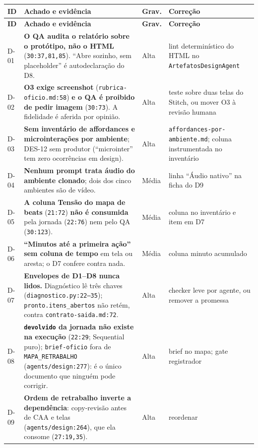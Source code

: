 \documentclass[11pt,a4paper]{article}
\begin{document}
\small
\begin{longtable}{@{}p{0.9cm} >{\raggedright\arraybackslash}p{8.6cm} p{1.1cm} >{\raggedright\arraybackslash}p{4.9cm}@{}}
\toprule
\textbf{ID} & \textbf{Achado e evidência} & \textbf{Grav.} & \textbf{Correção} \\
\midrule
\endfirsthead
\toprule
\textbf{ID} & \textbf{Achado e evidência} & \textbf{Grav.} & \textbf{Correção} \\
\midrule
\endhead
\bottomrule
\endfoot
D-01 & \textbf{O QA audita o relatório sobre o protótipo, não o HTML} (\texttt{30:37,81,85}). ``Abre sozinho, sem placeholder'' é autodeclaração do D8. & Alta & lint determinístico do HTML no \texttt{ArtefatosDesignAgent} \\
D-02 & \textbf{O3 exige screenshot} (\texttt{rubrica-oficio.md:58}) \textbf{e o QA é proibido de pedir imagem} (\texttt{30:73}). A fidelidade é aferida por opinião. & Alta & teste sobre duas telas do Stitch, ou mover O3 à revisão humana \\
D-03 & \textbf{Sem inventário de affordances e microinterações por ambiente}; DES-12 sem produtor (``microinter'' tem zero ocorrências em design). & Alta & \texttt{affordances-por-ambiente.md}; coluna instrumentada no inventário \\
D-04 & \textbf{Nenhum prompt trata áudio do ambiente clonado}; dois dos cinco ambientes são de vídeo. & Média & linha ``Áudio nativo'' na ficha do D9 \\
D-05 & \textbf{A coluna Tensão do mapa de beats} (\texttt{21:72}) \textbf{não é consumida} pela jornada (\texttt{22:76}) nem pelo QA (\texttt{30:123}). & Média & coluna no inventário e item em D7 \\
D-06 & \textbf{``Minutos até a primeira ação'' sem coluna de tempo} em tela ou aresta; o D7 confere contra nada. & Média & coluna minuto acumulado \\
D-07 & \textbf{Envelopes de D1--D8 nunca lidos.} Diagnóstico lê três chaves (\texttt{diagnostico.py:22--35}); \texttt{pronto.itens\_abertos} não retém, contra \texttt{contrato-saida.md:72}. & Alta & checker leve por agente, ou remover a promessa \\
D-08 & \textbf{\texttt{devolvido} da jornada não existe na execução} (\texttt{22:29}; Sequential puro); \texttt{brief-oficio} fora de \texttt{MAPA\_RETRABALHO} (\texttt{agents/design:277}): é o único documento que ninguém pode corrigir. & Alta & brief no mapa; gate registrador \\
D-09 & \textbf{Ordem de retrabalho inverte a dependência}: copy-revisão antes de CAA e telas (\texttt{agents/design:264}), que ela consome (\texttt{27:19,35}). & Alta & reordenar \\

\end{longtable}
\end{document}
